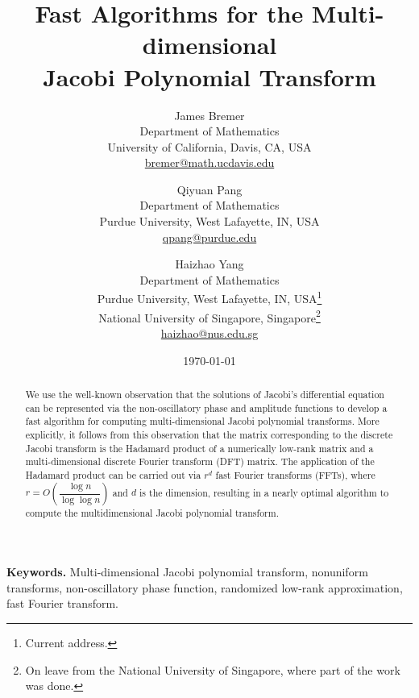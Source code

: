 \documentclass[11pt]{article}
\begin{document}
\title{Fast Algorithms for the Multi-dimensional\\ Jacobi Polynomial Transform}
\author{James Bremer \\ Department of Mathematics\\ University of California, Davis, CA, USA\\ \href{mailto:bremer@math.ucdavis.edu}{bremer@math.ucdavis.edu}
\and Qiyuan Pang \\ Department of Mathematics\\ Purdue University, West Lafayette, IN, USA\\  \href{mailto:qpang@purdue.edu}{qpang@purdue.edu} 
     \and Haizhao Yang \\ Department of Mathematics\\ Purdue University, West Lafayette, IN, USA\footnote{Current address.}\\ National University of Singapore, Singapore\footnote{On leave from the National University of Singapore, where part of the work was done.}\\ \href{mailto:haizhao@nus.edu.sg}{haizhao@nus.edu.sg} }
     
\date{\today}
\maketitle



\begin{abstract}

We use the well-known observation that the solutions of Jacobi's differential equation can be represented via the non-oscillatory phase and amplitude functions to develop 
 a fast algorithm for computing multi-dimensional Jacobi polynomial transforms.
More explicitly,  it  follows from this observation that the matrix corresponding to the 
discrete Jacobi transform is the Hadamard product of a 
numerically low-rank matrix and a multi-dimensional discrete Fourier transform (DFT) matrix.
The application of the Hadamard product can be carried out via $r^d$ fast Fourier transforms (FFTs), where $r=O(\dfrac{\log n}{\log \log n})$ and $d$ is the dimension, resulting in a nearly optimal algorithm to compute the multidimensional Jacobi polynomial transform. 

\end{abstract}



{\bf Keywords.} Multi-dimensional Jacobi polynomial transform, nonuniform transforms, non-oscillatory phase function, randomized low-rank approximation, fast Fourier transform. 
\end{document}
